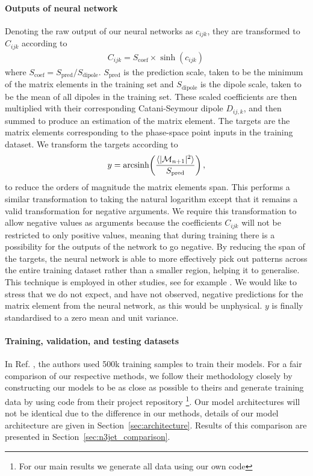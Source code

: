 \documentclass[main.tex]{subfiles}
\begin{document}
\paragraph*{Outputs of neural network}
Denoting the raw output of our neural networks as $c_{ijk}$, they are transformed to $C_{ijk}$ according to
\begin{eqnarray}\label{eq:coef_output}
    C_{ijk} = S_{\mathrm{coef}} \times \sinh{(c_{ijk})} \,
\end{eqnarray}
where $S_{\mathrm{coef}} = S_{\mathrm{pred}} / S_{\mathrm{dipole}}$.
$S_{\mathrm{pred}}$ is the prediction scale, taken to be the minimum of the matrix elements in the training set and $S_{\mathrm{dipole}}$ is the dipole scale, taken to be the mean of all dipoles in the training set.
These scaled coefficients are then multiplied with their corresponding Catani-Seymour dipole $D_{ij,k}$, and then summed to produce an estimation of the matrix element.
The targets are the matrix elements corresponding to the phase-space point inputs in the training dataset. We transform the targets according to
\begin{eqnarray}\label{eq:arcsinh}
    y = \mathrm{arcsinh}{\left(\dfrac{\langle | \mathcal{M}_{n+1}|^{2} \rangle}{S_{\mathrm{pred}}}\right)} \, ,
\end{eqnarray}
to reduce the orders of magnitude the matrix elements span.
This performs a similar transformation to taking the natural logarithm except that it remains a valid transformation for negative arguments.
We require this transformation to allow negative values as arguments because the coefficients $C_{ijk}$ will not be restricted to only positive values, meaning that during training there is a possibility for the outputs of the network to go negative.
By reducing the span of the targets, the neural network is able to more effectively pick out patterns across the entire training dataset rather than a smaller region, helping it to generalise.
This technique is employed in other studies, see for example \cite{Coccaro_2020,Bury_2021}.
We would like to stress that we do not expect, and have not observed, negative predictions for the matrix element from the neural network, as this would be unphysical.
$y$ is finally standardised to a zero mean and unit variance.

\paragraph*{Training, validation, and testing datasets}
In Ref. \cite{Badger:2020uow}, the authors used 500k training samples to train their models.
For a fair comparison of our respective methods, we follow their methodology closely by constructing our models to be as close as possible to theirs and generate training data by using code from their project repository \cite{n3jet_repo}\footnote{For our main results we generate all data using our own code}.
Our model architectures will not be identical due to the difference in our methods, details of our model architecture are given in Section~\ref{sec:architecture}.
Results of this comparison are presented in Section~\ref{sec:n3jet_comparison}.
\end{document}

